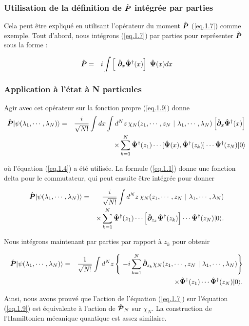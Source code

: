 \subsubsection{Utilisation de la définition de $\hat{\bm{P}}$ intégrée par parties }

Cela peut être expliqué en utilisant l'opérateur du moment $\hat{\bm{P}}$ (\ref{eq.1.7}) comme exemple. Tout d'abord, nous intégrons (\ref{eq.1.7}) par parties pour représenter $\hat{\bm{P}}$ sous la forme :

\begin{eqnarray*}
	\operator{P} & = & i \int \left [ \operator{\partial}_x \operator{\Psi}^\dag(x)\right ] \operator{\Psi}(x) dx 
\end{eqnarray*}

\subsubsection{Application à l’état à N particules}

Agir avec cet opérateur sur la fonction propre (\ref{eq.1.9}) donne 
\begin{eqnarray*}
	\hat{\bm{P}}\vert \psi ( \lambda_1 , \cdots , \lambda_N ) \rangle & = & \frac{i}{ \sqrt{N!}} \int dx \int d^N z \, \chi_N ( z_1 , \cdots , z_N  ~\vert ~ \lambda_1 , \cdots , \lambda _N ) 	\left [\hat{\bm{\partial}}_x \hat{\bm{\Psi}}^\dag(x)\right ]  \\ & & \times \sum_{k = 1 }^N \hat{\bm{\Psi}}^\dag(z_1) \cdots [\hat{\bm{\Psi}}(x) , \hat{\bm{\Psi}}^\dag(z_k)] \cdots \hat{\bm{\Psi}}^\dag(z_N) \vert 0 \rangle
\end{eqnarray*}

où l'équation (\ref{eq.1.4}) a été utilisée. La formule (\ref{eq.1.1}) donne une fonction delta pour le commutateur, qui peut ensuite être intégrée pour donner

\begin{eqnarray*}
	\hat{\bm{P}}\vert \psi ( \lambda_1 , \cdots , \lambda_N ) \rangle & = & \frac{i}{ \sqrt{N!}}  \int d^N z 	\, \chi_N ( z_1 , \cdots , z_N  ~\vert ~ \lambda_1 , \cdots , \lambda _N ) \\ & & \times  \sum_{k = 1 }^N  \hat{\bm{\Psi}}^\dag(z_1) \cdots \left [\hat{\bm{\partial}}_{z_k} \hat{\bm{\Psi}}^\dag(z_k)\right ] \cdots \hat{\bm{\Psi}}^\dag(z_N) \vert 0 \rangle. 
\end{eqnarray*}

Nous intégrons maintenant par parties par rapport à $z_k$ pour obtenir

\begin{eqnarray*}
	\operator{P}\vert \psi ( \lambda_1 , \cdots , \lambda_N ) \rangle & = & \frac{1}{ \sqrt{N!}}  \int d^N z 	 \left \{  -i \sum_{k = 1 }^N  \operator{\partial}_{z_k}\chi_N ( z_1 , \cdots , z_N  ~\vert ~ \lambda_1 , \cdots , \lambda _N ) \right \} \\ && \times \operator{\Psi}^\dag(z_1) \cdots \operator{\Psi}^\dag(z_N) \vert 0 \rangle. 
\end{eqnarray*}

Ainsi, nous avons prouvé que l'action de l'équation (\ref{eq.1.7}) sur l'équation (\ref{eq.1.9}) est équivalente à l'action de $\hat{\bm{\mathcal{P}}}_N$ sur \(\chi_N\). La construction de l'Hamiltonien mécanique quantique est assez similaire.
